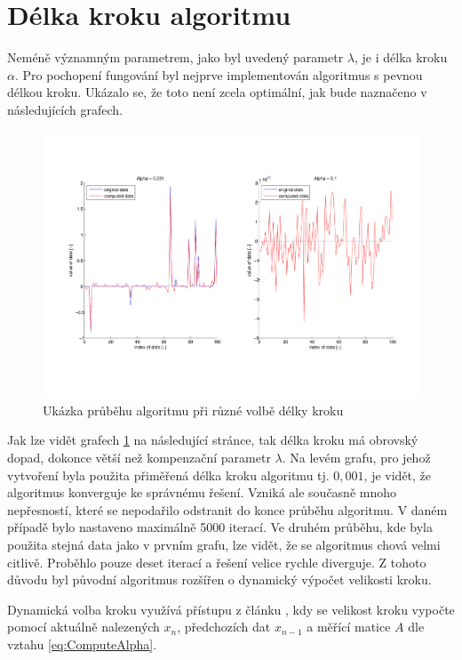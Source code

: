 \documentclass[FM,BP]{tulthesis}
\begin{document}
\section{Délka kroku algoritmu}
\label{subch:dynamicStep}
Neméně významným parametrem, jako byl uvedený parametr $ \lambda $, je i délka kroku $ \alpha $. Pro pochopení fungování byl nejprve implementován algoritmus s pevnou délkou kroku. Ukázalo se, že toto není zcela optimální, jak bude naznačeno v následujících grafech.
\begin{figure}[!ht]
\begin{center}
\includegraphics[scale=0.57]{obr/basic.pdf}
\end{center}
\caption{Ukázka průběhu algoritmu při různé volbě délky kroku}
\label{fig:basicAlpha}
\end{figure} 

Jak lze vidět grafech \ref{fig:basicAlpha} na následující stránce, tak délka kroku má obrovský dopad, dokonce větší než kompenzační parametr $\lambda$. Na levém grafu, pro jehož vytvoření byla použita přiměřená délka kroku algoritmu tj. $0,001$, je vidět, že algoritmus konverguje ke správnému řešení. Vzniká ale současně mnoho nepřesností, které se nepodařilo odstranit do konce průběhu algoritmu. V daném případě bylo nastaveno maximálně 5000 iterací. Ve druhém průběhu, kde byla použita stejná data jako v prvním grafu, lze vidět, že se algoritmus chová velmi citlivě. Proběhlo pouze deset iterací a řešení velice rychle diverguje. Z tohoto důvodu byl původní algoritmus rozšířen o dynamický výpočet velikosti kroku.

Dynamická volba kroku využívá přístupu z článku \cite{dynamickyKrok}, kdy se velikost kroku vypočte pomocí aktuálně nalezených $x_{n}$, předchozích dat $x_{n-1}$ a měřící matice $A$ dle vztahu \ref{eq:ComputeAlpha}.
\end{document}

